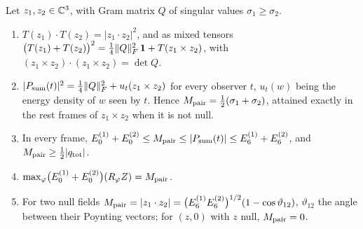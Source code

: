\begin{theorem}
\label{d6:thm:pair}
Let $z_1,z_2\in\mathbb{C}^3$, with Gram matrix $Q$ of singular values $\sigma_1\ge\sigma_2$.
\begin{enumerate}[label=(\roman*),leftmargin=2.2em]
\item $T(z_1)\cdot T(z_2)=|z_1\cdot z_2|^2$, and as mixed tensors $\bigl(T(z_1)+T(z_2)\bigr)^2=\tfrac14\|Q\|_F^2\,\mathbf 1+T(z_1\times z_2)$, with
$(z_1\times z_2)\cdot(z_1\times z_2)=\det Q$.
\item $|P_{\rm sum}(t)|^2=\tfrac14\|Q\|_F^2+u_t(z_1\times z_2)$ for every observer $t$, $u_t(w)$ being the energy density of $w$ seen by $t$. Hence
$M_{\rm pair}=\tfrac12(\sigma_1+\sigma_2)$, attained exactly in the rest frames of $z_1\times z_2$ when it is not null.
\item In every frame, $E_0^{(1)}+E_0^{(2)}\le M_{\rm pair}\le|P_{\rm sum}(t)|\le E_6^{(1)}+E_6^{(2)}$, and $M_{\rm pair}\ge\tfrac12|q_{\rm tot}|$.
\item $\max_\varphi\bigl(E_0^{(1)}+E_0^{(2)}\bigr)(R_\varphi Z)=M_{\rm pair}$.
\item For two null fields $M_{\rm pair}=|z_1\cdot z_2|=\bigl(E_6^{(1)}E_6^{(2)}\bigr)^{1/2}(1-\cos\vartheta_{12})$, $\vartheta_{12}$ the angle between
their Poynting vectors; for $(z,0)$ with $z$ null, $M_{\rm pair}=0$.
\end{enumerate}
\end{theorem}

